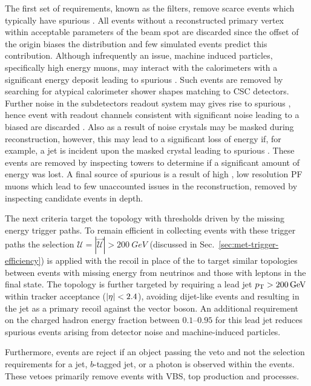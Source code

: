 The first set of requirements, known as the \ptmiss filters, remove scarce events which typically have spurious \ptmiss. All events without a reconstructed primary vertex within acceptable parameters of the beam spot are discarded since the offset of the origin biases the \ptmiss distribution and few simulated events predict this contribution. Although infrequently an issue, machine induced particles, specifically high energy muons, may interact with the calorimeters with a significant energy deposit leading to spurious \ptmiss. Such events are removed by searching for atypical calorimeter shower shapes matching to CSC detectors. Further noise in the \HCAL subdetectors readout system may gives rise to spurious \ptmiss, hence event with \HCAL readout channels consistent with significant noise leading to a biased \ptmiss are discarded \cite{CMS-DP-2016-061}. Also as a result of noise \ECAL crystals may be masked during reconstruction, however, this may lead to a significant loss of energy if, for example, a jet is incident upon the masked crystal leading to spurious \ptmiss. These events are removed by inspecting \HWT towers to determine if a significant amount of energy was lost. A final source of spurious \ptmiss is a result of high \pt, low resolution PF muons which lead to few unaccounted issues in the reconstruction, removed by inspecting candidate events in depth.

The next criteria target the \metplusjets topology with thresholds driven by the missing energy trigger paths. To remain efficient in collecting events with these trigger paths the selection ${\mathcal{U}=|\vec{\mathcal{U}}|>\SI{200}{GeV}}$ (discussed in Sec.~\ref{sec:met-trigger-efficiency}) is applied with the recoil in place of the \ptmiss to target similar topologies between events with missing energy from neutrinos and those with leptons in the final state. The topology is further targeted by requiring a lead jet ${p_{\text{T}}>\SI{200}{GeV}}$ within tracker acceptance (${|\eta|<2.4}$), avoiding dijet-like events and resulting in the jet as a primary recoil against the vector boson. An additional requirement on the charged hadron energy fraction between {$0.1$--$0.95$} for this lead jet reduces spurious \ptmiss events arising from detector noise and machine-induced particles.

Furthermore, events are reject if an object passing the veto and not the selection requirements for a jet, $b$-tagged jet, or a photon is observed within the events. These vetoes primarily remove events with VBS, top production and \Igj processes.

